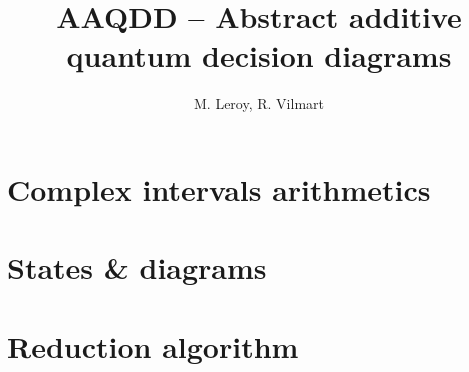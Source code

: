 \documentclass[a4paper]{report}
\title{AAQDD -- Abstract additive quantum decision diagrams}
\author{M. Leroy, R. Vilmart}
\begin{document}
\maketitle

\tableofcontents

\newpage

\chapter{Complex intervals arithmetics}



\chapter{States \& diagrams}



\chapter{Reduction algorithm}


\end{document}
